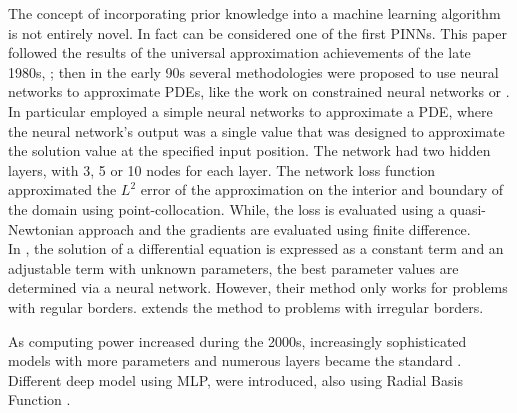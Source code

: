 \documentclass[pdflatex,sn-basic]{sn-jnl}%
\theoremstyle{thmstyleone}%
\theoremstyle{thmstyletwo}%
\theoremstyle{thmstylethree}%
\begin{document}
The concept of incorporating prior knowledge into a machine learning algorithm is not entirely novel.
In fact \cite{Dis1994_NeuralNetworkBased_PhaDP} can be considered one of the first PINNs. 
This paper followed the results of the universal approximation achievements of the late 1980s, \citep{Hor1989_MultilayerFeedforwardNetworks_StiHSW}; then in the early 90s several methodologies were proposed to use neural networks to approximate PDEs, like the work on constrained neural networks
\citep{Psi1992_HybridNeuralNetwork_UngPU, Lag1998_ArtificialNeuralNetworks_LikLLF}
or 
\citep{Lee1990_NeuralAlgorithmSolving_KanLK}.
In particular \cite{Dis1994_NeuralNetworkBased_PhaDP}
employed a simple neural networks to approximate a PDE, where the neural network's output was a single value that was designed to approximate the solution value at the specified input position. The network had two hidden layers, with 3, 5 or 10 nodes for each layer.
The network loss function approximated the $L^2$ error of the approximation on the interior and boundary of the domain using point-collocation.
While, the loss is evaluated using a quasi-Newtonian approach and the gradients are evaluated using finite difference.
\\
In \cite{Lag1998_ArtificialNeuralNetworks_LikLLF}, the solution of a differential equation is expressed as a constant term and an adjustable term with unknown parameters, the best parameter values are determined via a neural network. However, their method only works for problems with regular borders.
\cite{Lag2000_NeuralNetworkMethods_LikLLP} extends the method to problems with irregular borders.


As computing power increased during the 2000s, increasingly sophisticated models with more parameters and numerous layers became the standard \cite{Oez2021_PoissonCnnConvolutional_HamOeHL}. 
Different deep model using MLP, were introduced, also using Radial Basis Function \cite{Kum2011_MultilayerPerceptronsRadial_YadKY}.
\end{document}
